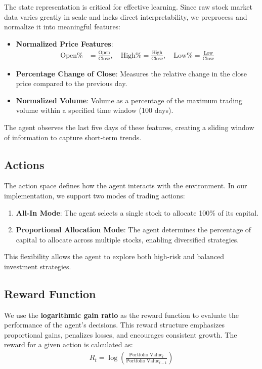 \documentclass[conference]{IEEEtran}
\begin{document}
The state representation is critical for effective learning. Since raw stock market data varies greatly in scale and lacks direct interpretability, we preprocess and normalize it into meaningful features:

\begin{itemize}
    \item \textbf{Normalized Price Features}:
    \begin{align*}
    \text{Open\%} &= \frac{\text{Open}}{\text{Close}}, \quad \text{High\%} = \frac{\text{High}}{\text{Close}}, \quad \text{Low\%} = \frac{\text{Low}}{\text{Close}}
    \end{align*}
    \item \textbf{Percentage Change of Close}: Measures the relative change in the close price compared to the previous day.
    \item \textbf{Normalized Volume}: Volume as a percentage of the maximum trading volume within a specified time window (100 days).
\end{itemize}

The agent observes the last five days of these features, creating a sliding window of information to capture short-term trends.

\subsection{Actions}

The action space defines how the agent interacts with the environment. In our implementation, we support two modes of trading actions:

\begin{enumerate}
    \item \textbf{All-In Mode}: The agent selects a single stock to allocate 100\% of its capital.
    \item \textbf{Proportional Allocation Mode}: The agent determines the percentage of capital to allocate across multiple stocks, enabling diversified strategies.
\end{enumerate}

This flexibility allows the agent to explore both high-risk and balanced investment strategies.

\subsection{Reward Function}

We use the \textbf{logarithmic gain ratio} as the reward function to evaluate the performance of the agent's decisions. This reward structure emphasizes proportional gains, penalizes losses, and encourages consistent growth. The reward for a given action is calculated as:
\begin{align*}
R_t = \log\left(\frac{\text{Portfolio Value}_{t}}{\text{Portfolio Value}_{t-1}}\right)
\end{align*}
\end{document}
